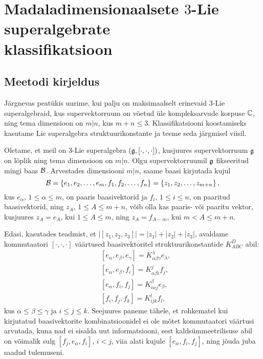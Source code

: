 

\section[Madaladimensionaalsete \texorpdfstring{$3$}{3}-Lie superalgebrate
klassifikatsioon]{Madaladimensionaalsete \texorpdfstring{$3$}{3}-Lie
superalgebrate \\ klassifikatsioon}\label{section:klassifikatsioon}

\subsection{Meetodi kirjeldus}

Järgnevas peatükis uurime, kui palju on maksimaalselt erinevaid $3$-Lie
superalgebraid, kus supervektorruum on võetud üle kompleksarvude korpuse $\mathbb{C}$,
ning tema dimensioon on $m|n$, kus $m + n \leq 3$.
Klassifikatsiooni koostamiseks kasutame Lie superalgebra struktuurikonstante
ja teeme seda järgmisel viisil.

Oletame, et meil on 3-Lie superalgebra $(\mathfrak{g}, [\cdot, \cdot, \cdot])$,
kusjuures supervektorruum $\mathfrak{g}$ on lõplik ning tema dimensioon on $m|n$. Olgu
supervektorruumil $\mathfrak{g}$ fikseeritud mingi baas $\mathcal{B}$. Arvestades dimensiooni
$m|n$, saame baasi kirjutada kujul
\[
    \mathcal{B} = \left\{ e_1, e_2, \dots, e_m, f_1, f_2, \dots, f_n \right\} =
         \left\{ z_1, z_2, \dots, z_{m+n} \right\},
\]
kus $e_\alpha$, $1 \leq \alpha \leq m$, on paaris baasivektorid ja
$f_i$, $1 \leq i \leq n$, on paaritud baasivektorid, ning $z_A$,
$1 \leq A \leq m+n$, võib olla kas paaris- või paaritu vektor, kusjuures
$z_A = e_A$, kui $1 \leq A \leq m$, ning $z_A = f_{A-m}$, kui
$m < A \leq m+n$.

Edasi, kasutades teadmist, et $|[z_1, z_2, z_3]| = |z_1| + |z_2| + |z_3|$,
avaldame kommutaatori $[\cdot, \cdot, \cdot]$ väärtused baasivektoritel
struktuurikonstantide $K_{ABC}^D$ abil:
\begin{align*}
    &[e_\alpha, e_\beta, e_\gamma] =
        K_{\alpha \beta \gamma}^\lambda e_\lambda, \\
    &[e_\alpha, e_\beta, f_i] = K_{\alpha \beta i}^j f_j, \\
    &[e_\alpha, f_i, f_j] = K_{\alpha i j}^\beta e_\beta, \\
    &[f_i, f_j, f_k] = K_{i j k}^l f_l,
\end{align*}
kus $\alpha \leq \beta \leq \gamma$ ja $i \leq j \leq  k$.
Seejuures paneme tähele, et rohkematel kui kirjutatud baasivektorite
kombinatsioonidel ei ole mõtet kommutaatori väärtusi arvutada, kuna nad ei
sisalda uut informatsiooni, sest kaldsümmeetrilisuse abil on võimalik
sulg $[f_j, e_\alpha, f_i]$, $i < j$, viia alati kujule $[e_\alpha, f_i, f_j]$,
ning jõuda juba saadud tulemuseni.


